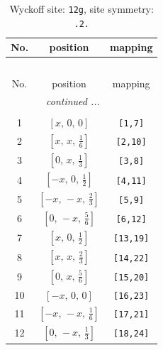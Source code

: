 \documentclass[fleqn,8pt]{jsarticle}
\begin{document}
\begin{longtable}{ccc}
\caption{Wyckoff site: {\tt 12g}, site symmetry: {\tt .2.}}
 \\
 \hline \hline
No. & position & mapping \\ \hline \endfirsthead

\multicolumn{2}{l}{\tablename\ \thetable{}} \\
 \hline \hline
No. & position & mapping \\ \hline \endhead

 \hline \hline
\multicolumn{2}{r}{\footnotesize\it continued ...} \\ \endfoot

 \hline \hline
\multicolumn{2}{r}{} \\ \endlastfoot

1 & $\left[ x,\, 0,\, 0 \right]$ & {\tt [1,7]} \\ \hline
2 & $\left[ x,\, x,\, \frac{1}{6} \right]$ & {\tt [2,10]} \\ \hline
3 & $\left[ 0,\, x,\, \frac{1}{3} \right]$ & {\tt [3,8]} \\ \hline
4 & $\left[ - x,\, 0,\, \frac{1}{2} \right]$ & {\tt [4,11]} \\ \hline
5 & $\left[ - x,\, - x,\, \frac{2}{3} \right]$ & {\tt [5,9]} \\ \hline
6 & $\left[ 0,\, - x,\, \frac{5}{6} \right]$ & {\tt [6,12]} \\ \hline
7 & $\left[ x,\, 0,\, \frac{1}{2} \right]$ & {\tt [13,19]} \\ \hline
8 & $\left[ x,\, x,\, \frac{2}{3} \right]$ & {\tt [14,22]} \\ \hline
9 & $\left[ 0,\, x,\, \frac{5}{6} \right]$ & {\tt [15,20]} \\ \hline
10 & $\left[ - x,\, 0,\, 0 \right]$ & {\tt [16,23]} \\ \hline
11 & $\left[ - x,\, - x,\, \frac{1}{6} \right]$ & {\tt [17,21]} \\ \hline
12 & $\left[ 0,\, - x,\, \frac{1}{3} \right]$ & {\tt [18,24]} \\
\end{longtable}
\renewcommand{\arraystretch}{1.2}
\end{document}
